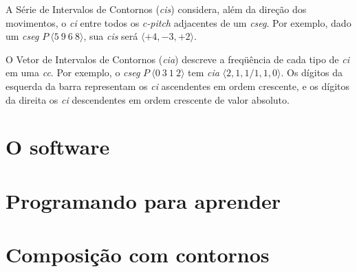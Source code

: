 \documentclass{article}
\newcommand{\termo}[1]{\textit{#1}}
\begin{document}
A Série de Intervalos de Contornos (\termo{cis}) considera, além da
direção dos movimentos, o \termo{ci} entre todos os \termo{c-pitch}
adjacentes de um \termo{cseg}. Por exemplo, dado um \termo{cseg}
$P\:\langle5\:9\:6\:8\rangle$, sua \termo{cis} será
$\langle+4,-3,+2\rangle$.

O Vetor de Intervalos de Contornos (\termo{cia}) descreve a freqüência
de cada tipo de \termo{ci} em uma \termo{cc}. Por exemplo, o
\termo{cseg} $P\:\langle0\:3\:1\:2\rangle$ tem \termo{cia}
$\langle2,1,1/1,1,0\rangle$. Os dígitos da esquerda da barra
representam os \termo{ci} ascendentes em ordem crescente, e os dígitos
da direita os \termo{ci} descendentes em ordem crescente de valor
absoluto.

\section{O software}
\label{sec:o-software}

\section{Programando para aprender}
\label{sec:progr-para-aprend}

\section{Composição com contornos}
\label{sec:comp-com-cont}

\renewcommand{\refname}{Referências Bibliográficas}


\end{document}
